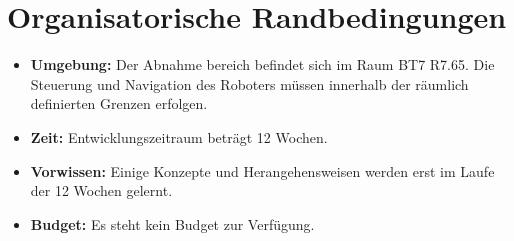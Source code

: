\section{Organisatorische Randbedingungen}
\begin{itemize}

    \item \textbf{Umgebung:}  
    Der Abnahme bereich befindet sich im Raum BT7 R7.65. Die Steuerung und Navigation des Roboters müssen innerhalb der räumlich definierten Grenzen erfolgen.
    \item \textbf{Zeit:} Entwicklungszeitraum beträgt 12 Wochen. 
    \item \textbf{Vorwissen:} Einige Konzepte und Herangehensweisen werden erst im Laufe der 12 Wochen gelernt.
    \item \textbf{Budget:} Es steht kein Budget zur Verfügung.

\end{itemize}

